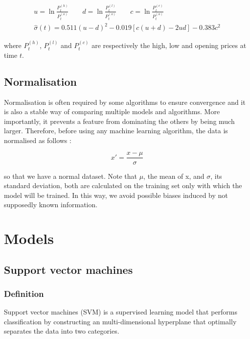 \documentclass[11pt,a4paper,oneside]{book}
\begin{document}
\begin{equation}\label{volatility}
\begin{matrix}
u = \ln\frac{P_t^{(h)}}{P_t^{(o)}} \qquad
d = \ln\frac{P_t^{(l)}}{P_t^{(o)}} \qquad
c = \ln\frac{P_t^{(c)}}{P_t^{(o)}} \\
\hat{\sigma}\left ( t \right ) = 0.511\left ( u - d \right )^2 - 0.019\left [ c\left (u + d\right ) - 2ud\right ] - 0.383c^2
\end{matrix}
\end{equation}

where $P_t^{(h)}$, $P_t^{(l)}$ and $P_t^{(c)}$ are respectively the high, low and opening prices at time $t$.


\subsection{Normalisation}

Normalisation is often required by some algorithms to ensure convergence and it is also a stable way of comparing multiple models and algorithms. More importantly, it prevents a feature from dominating the others by being much larger. Therefore, before using any machine learning algorithm, the data is normalised as follows : 

\begin{equation}
{x}' = \frac{x - \mu }{\sigma }
\end{equation}

so that we have a normal dataset. Note that $\mu$, the mean of x, and $\sigma$, its standard deviation, both are calculated on the training set only with which the model will be trained. In this way, we avoid possible biases induced by not supposedly known information.




\section{Models}\label{MLalgs}

\subsection{Support vector machines}

\subsubsection{Definition}

Support vector machines (SVM) is a supervised learning model that performs classification by constructing an multi-dimensional hyperplane that optimally separates the data into two categories. 
\end{document}
